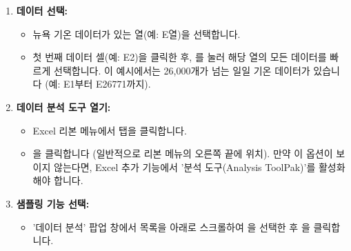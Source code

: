 \documentclass[11pt,a4paper]{article}
\theoremstyle{definition}
\begin{document}
\begin{enumerate}
    \item \textbf{데이터 선택:}
    \begin{itemize}
        \item 뉴욕 기온 데이터가 있는 열(예: E열)을 선택합니다.
        \item 첫 번째 데이터 셀(예: E2)을 클릭한 후, 를 눌러 해당 열의 모든 데이터를 빠르게 선택합니다. 이 예시에서는 26,000개가 넘는 일일 기온 데이터가 있습니다 (예: E1부터 E26771까지).
    \end{itemize}

    \item \textbf{데이터 분석 도구 열기:}
    \begin{itemize}
        \item Excel 리본 메뉴에서  탭을 클릭합니다.
        \item {}을 클릭합니다 (일반적으로 리본 메뉴의 오른쪽 끝에 위치). 만약 이 옵션이 보이지 않는다면, Excel 추가 기능에서 '분석 도구(Analysis ToolPak)'를 활성화해야 합니다.
    \end{itemize}

    \item \textbf{샘플링 기능 선택:}
    \begin{itemize}
        \item '데이터 분석' 팝업 창에서 목록을 아래로 스크롤하여 을 선택한 후 을 클릭합니다.
    \end{itemize}


\end{enumerate}
\end{document}
